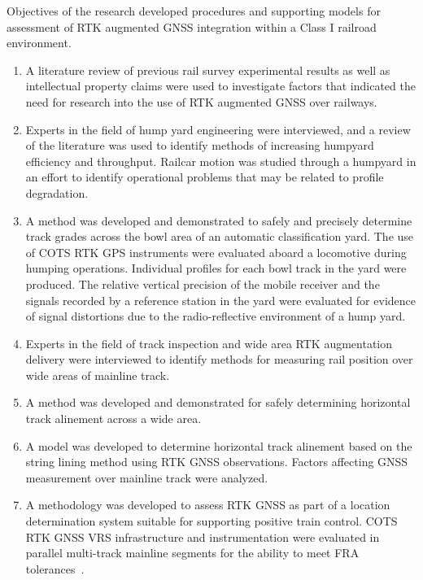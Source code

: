 Objectives of the research developed procedures and supporting models for assessment of RTK augmented GNSS integration within a Class I railroad environment.
\begin{enumerate}[1)]
\firmlist
\item A literature review of previous rail survey experimental results as well as intellectual property claims were used to investigate factors that indicated the need for  research into the use of RTK augmented GNSS over railways.
\item Experts in the field of hump yard engineering were interviewed, and a review of the literature was used to identify methods of increasing humpyard efficiency and throughput. Railcar motion was studied through a humpyard in an effort to identify operational problems that may be related to profile degradation.
\item A method was developed and demonstrated to safely and precisely determine track grades across the bowl area of an automatic classification yard. The use of COTS RTK GPS instruments were evaluated aboard a locomotive during humping operations. Individual profiles for each bowl track in the yard were produced. The relative vertical precision of the mobile receiver and the signals recorded by a reference station in the yard were evaluated for evidence of signal distortions due to the radio-reflective environment of a hump yard.
\item Experts in the field of track inspection and wide area RTK augmentation delivery were interviewed to identify methods for measuring rail position over wide areas of mainline track.
\item A method was developed and demonstrated for safely determining horizontal track alinement across a wide area.
\item A model was developed to determine horizontal track alinement based on the string lining method using RTK GNSS observations. Factors affecting GNSS measurement over mainline track were analyzed.
\item A methodology was developed to assess RTK GNSS as part of a location determination system suitable for supporting positive train control. COTS RTK GNSS VRS infrastructure and instrumentation were evaluated in parallel multi-track mainline segments for the ability to meet FRA tolerances~\cite[4-5]{1995FRADiffe}.
\end{enumerate}


